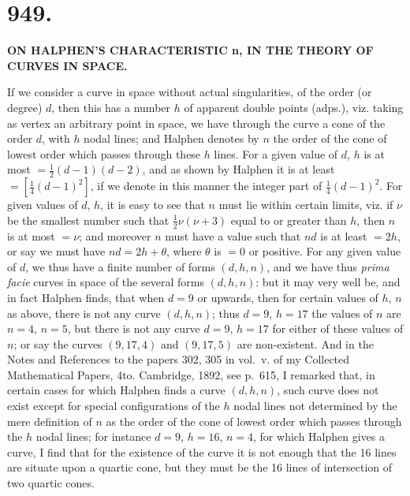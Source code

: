\documentclass[12pt,a4paper]{article}
\begin{document}
\newpage
\section*{949.}

\begin{center}
{\large\bfseries ON HALPHEN'S CHARACTERISTIC n, IN THE THEORY OF CURVES IN SPACE.}
\end{center}

\begin{flushright}
\end{flushright}

If we consider a curve in space without actual singularities, of the order (or degree) $d$, then this has a number $h$ of apparent double points (adps.), viz. taking as vertex an arbitrary point in space, we have through the curve a cone of the order $d$, with $h$ nodal lines; and Halphen denotes by $n$ the order of the cone of lowest order which passes through these $h$ lines. For a given value of $d$, $h$ is at most $=\frac{1}{2}(d-1)(d-2)$, and as shown by Halphen it is at least $=[\frac{1}{4}(d-1)^{2}]$, if we denote in this manner the integer part of $\frac{1}{4}(d-1)^{2}$. For given values of $d$, $h$, it is easy to see that $n$ must lie within certain limits, viz. if $\nu$ be the smallest number such that $\frac{1}{2}\nu(\nu+3)$ equal to or greater than $h$, then $n$ is at most $=\nu$; and moreover $n$ must have a value such that $nd$ is at least $=2h$, or say we must have $nd = 2h + \theta$, where $\theta$ is $=0$ or positive. For any given value of $d$, we thus have a finite number of forms $(d, h, n)$, and we have thus \textit{prima facie} curves in space of the several forms $(d, h, n)$: but it may very well be, and in fact Halphen finds, that when $d = 9$ or upwards, then for certain values of $h$, $n$ as above, there is not any curve $(d, h, n)$; thus $d = 9$, $h = 17$ the values of $n$ are $n = 4$, $n = 5$, but there is not any curve $d = 9$, $h = 17$ for either of these values of $n$; or say the curves $(9, 17, 4)$ and $(9, 17, 5)$ are non-existent. And in the Notes and References to the papers 302, 305 in vol.~v. of my Collected Mathematical Papers, 4to. Cambridge, 1892, see p.~615, I remarked that, in certain cases for which Halphen finds a curve $(d, h, n)$, such curve does not exist except for special configurations of the $h$ nodal lines not determined by the mere definition of $n$ as the order of the cone of lowest order which passes through the $h$ nodal lines; for instance $d = 9$, $h = 16$, $n = 4$, for which Halphen gives a curve, I find that for the existence of the curve it is not enough that the 16 lines are situate upon a quartic cone, but they must be the 16 lines of intersection of two quartic cones.
\end{document}
